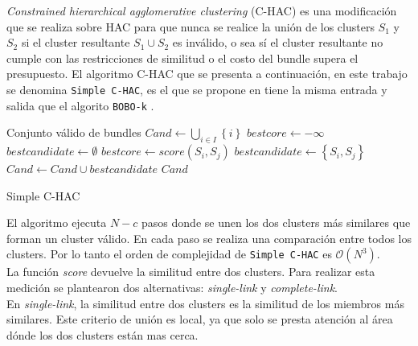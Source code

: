 \textit{Constrained hierarchical agglomerative clustering} (C-HAC) es una modificación que se realiza sobre HAC para que nunca se realice la unión de los clusters $S_1$ y $S_2$ si el cluster resultante $S_1 \cup S_2$ es inválido, o sea sí el cluster resultante no cumple con las restricciones de similitud o el costo del bundle supera el presupuesto. El algoritmo C-HAC que se presenta a continuación, en este trabajo se denomina \texttt{Simple C-HAC}, es el que se propone en \cite{compositeRetrival} tiene la misma entrada y salida que el algorito \texttt{BOBO-k} .\\

\begin{algorithm}[H]
\begin{algorithmic}[1]
\ENSURE Conjunto válido de bundles
\STATE $Cand \leftarrow \bigcup_{i \in I}\left\{i\right\}$
	\STATE $bestcore \leftarrow -\infty$
	\STATE $bestcandidate \leftarrow \emptyset$
			 \label{validMerge}
				 \label{score}
					\STATE $bestcore \leftarrow score(S_i,S_j)$
					\STATE $bestcandidate \leftarrow \left\{S_i,S_j\right\}$
				\ENDIF
			\ENDIF
		\ENDFOR
	\ENDFOR
		\BREAK
	\ENDIF
	\STATE $Cand \leftarrow Cand \cup bestcandidate $
\ENDWHILE
\RETURN $Cand$
\end{algorithmic}
\caption{Simple C-HAC}\label{alg:SimpleC-HAC}
\end{algorithm}

El algoritmo ejecuta $N - c$ pasos donde se unen los dos clusters más similares que forman un cluster válido. En cada paso se realiza una comparación entre todos los clusters. Por lo tanto el orden de complejidad de \texttt{Simple C-HAC} es $\mathcal{O}(N^{3})$.\\

La función \textit{score} devuelve la similitud entre dos clusters. Para realizar esta medición se plantearon dos alternativas: \textit{single-link} y \textit{complete-link}.\\

En \textit{single-link}, la similitud entre dos clusters es la similitud de los miembros más similares. Este criterio de unión es local, ya que solo se presta atención al área dónde los dos clusters están mas cerca.\\

